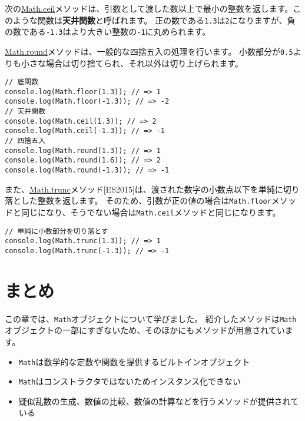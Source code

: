次の\href{https://developer.mozilla.org/ja/docs/Web/JavaScript/Reference/Global_Objects/Math/ceil}{Math.ceil}メソッドは、引数として渡した数以上で最小の整数を返します。このような関数は\textbf{天井関数}と呼ばれます。
正の数である\texttt{1.3}は\texttt{2}になりますが、負の数である\texttt{-1.3}はより大きい整数の\texttt{-1}に丸められます。

\href{https://developer.mozilla.org/ja/docs/Web/JavaScript/Reference/Global_Objects/Math/round}{Math.round}メソッドは、一般的な四捨五入の処理を行います。
小数部分が\texttt{0.5}よりも小さな場合は切り捨てられ、それ以外は切り上げられます。

\begin{lstlisting}
// 底関数
console.log(Math.floor(1.3)); // => 1
console.log(Math.floor(-1.3)); // => -2
// 天井関数
console.log(Math.ceil(1.3)); // => 2
console.log(Math.ceil(-1.3)); // => -1
// 四捨五入
console.log(Math.round(1.3)); // => 1
console.log(Math.round(1.6)); // => 2
console.log(Math.round(-1.3)); // => -1
\end{lstlisting}

また、\href{https://developer.mozilla.org/ja/docs/Web/JavaScript/Reference/Global_Objects/Math/trunc}{Math.trunc}メソッド{[}ES2015{]}は、渡された数字の小数点以下を単純に切り落とした整数を返します。
そのため、引数が正の値の場合は\texttt{Math.floor}メソッドと同じになり、そうでない場合は\texttt{Math.ceil}メソッドと同じになります。

\begin{lstlisting}
// 単純に小数部分を切り落とす
console.log(Math.trunc(1.3)); // => 1
console.log(Math.trunc(-1.3)); // => -1
\end{lstlisting}

\hypertarget{conclusion}{%
\section{まとめ}\label{conclusion}}

この章では、\texttt{Math}オブジェクトについて学びました。
紹介したメソッドは\texttt{Math}オブジェクトの一部にすぎないため、そのほかにもメソッドが用意されています。

\begin{itemize}
\item
  \texttt{Math}は数学的な定数や関数を提供するビルトインオブジェクト
\item
  \texttt{Math}はコンストラクタではないためインスタンス化できない
\item
  疑似乱数の生成、数値の比較、数値の計算などを行うメソッドが提供されている
\end{itemize}
